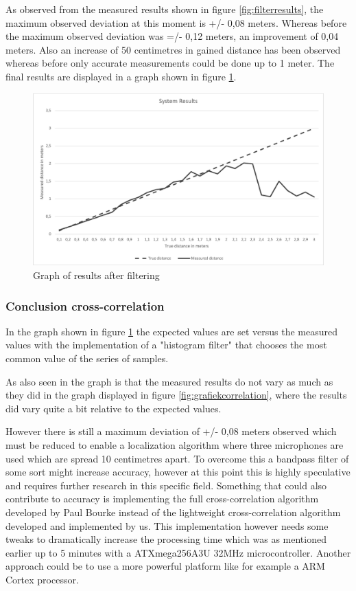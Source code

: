 \documentclass[10pt,a4paper]{article}
\begin{document}
As observed from the measured results shown in figure \ref{fig:filterresults}, the maximum observed deviation at this moment is +/- 0,08 meters. Whereas before the maximum observed deviation was =/- 0,12 meters, an improvement of 0,04 meters. Also an increase of 50 centimetres in gained distance has been observed whereas before only accurate measurements could be done up to 1 meter. The final results are displayed in a graph shown in figure \ref{fig:filtergraph}.

\begin{figure}[H]
   \centering
   \includegraphics[width=\textwidth]{filtergraph.pdf}
   \caption{Graph of results after filtering}
   \label{fig:filtergraph}
\end{figure}

\subsubsection{Conclusion cross-correlation}
In the graph shown in figure \ref{fig:filtergraph} the expected values are set versus the measured values with the implementation of a "histogram filter" that chooses the most common value of the series of samples. 

As also seen in the graph is that the measured results do not vary as much as they did in the graph displayed in figure \ref{fig:grafiekcorrelation}, where the results did vary quite a bit relative to the expected values. 

However there is still a maximum deviation of +/- 0,08 meters observed which must be reduced to enable a localization algorithm where three microphones are used which are spread 10 centimetres apart. To overcome this a bandpass filter of some sort might increase accuracy, however at this point this is highly speculative and requires further research in this specific field. Something that could also contribute to accuracy is implementing the full cross-correlation algorithm developed by Paul Bourke instead of the lightweight cross-correlation algorithm developed and implemented by us. This implementation however needs some tweaks to dramatically increase the processing time which was as mentioned earlier up to 5 minutes with a ATXmega256A3U 32MHz microcontroller. Another approach could be to use a more powerful platform like for example a ARM Cortex processor.
\end{document}
